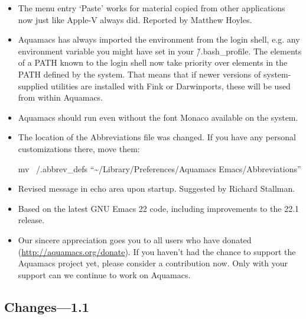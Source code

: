 \begin{itemize}
\item The menu entry `Paste' works for material copied from other
  applications now just like Apple-V always did.
Reported by Matthew Hoyles.

\item Aquamacs has always imported the environment from the login
  shell, e.g. any environment variable you might have set in your
  \~/.bash\_profile. The elements of a PATH known to the login shell now
  take priority over elements in the PATH defined by the system. That
  means that if newer versions of system-supplied utilities are
  installed with Fink or Darwinports, these will be used from within
  Aquamacs.

\item Aquamacs should run even without the font Monaco available on the system.

\item The location of the Abbreviations file was changed. If you have any personal customizations there, move them:

mv ~/.abbrev\_defs ``{\textasciitilde{}}/Library/Preferences/Aquamacs Emacs/Abbreviations''

\item Revised message in echo area upon startup.
Suggested by Richard Stallman.

\item Based on the latest GNU Emacs 22 code, including improvements to
  the 22.1 release.


\item Our sincere appreciation goes you to all users who have donated
        (\url{http://aquamacs.org/donate}). If you haven't had the
        chance to support the Aquamacs project yet, please consider a
        contribution now. Only with your support can we continue to
        work on Aquamacs.

\end{itemize}

\subsection{Changes---1.1}

